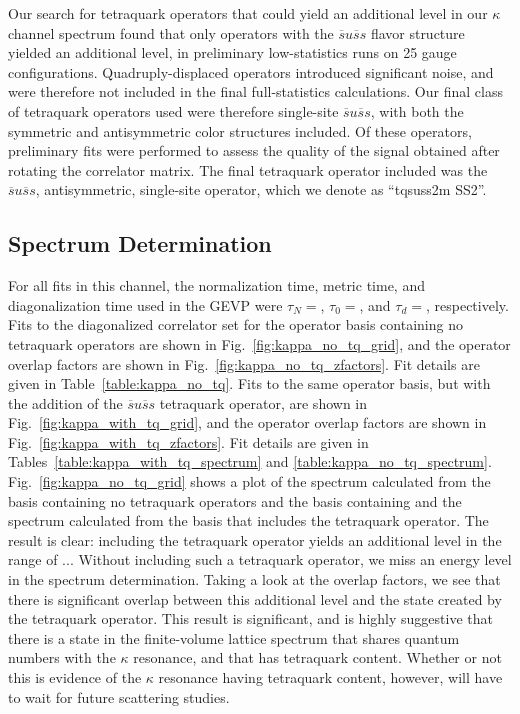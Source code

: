 Our search for tetraquark operators that could yield an additional level in our $\kappa$ channel spectrum found that only operators with the $\overline s u \overline s s$ flavor structure yielded an additional level, in preliminary low-statistics runs on 25 gauge configurations. Quadruply-displaced operators introduced significant noise, and were therefore not included in the final full-statistics calculations. Our final class of tetraquark operators used were therefore single-site $\overline s u \overline s s$, with both the symmetric and antisymmetric color structures included. Of these operators, preliminary fits were performed to assess the quality of the signal obtained after rotating the correlator matrix. The final tetraquark operator included was the $\overline s u \overline s s$, antisymmetric, single-site operator, which we denote as ``tqsuss2m SS2''.
\subsection{Spectrum Determination}
For all fits in this channel, the normalization time, metric time, and diagonalization time used in the GEVP were $\tau_N=$, $\tau_0=$, and $\tau_d=$, respectively. Fits to the diagonalized correlator set for the operator basis containing no tetraquark operators are shown in Fig.~\ref{fig:kappa_no_tq_grid}, and the operator overlap factors are shown in Fig.~\ref{fig:kappa_no_tq_zfactors}. Fit details are given in Table~\ref{table:kappa_no_tq}. Fits to the same operator basis, but with the addition of the $\overline s u \overline s s$ tetraquark operator, are shown in Fig.~\ref{fig:kappa_with_tq_grid}, and the operator overlap factors are shown in Fig.~\ref{fig:kappa_with_tq_zfactors}. Fit details are given in Tables~\ref{table:kappa_with_tq_spectrum} and \ref{table:kappa_no_tq_spectrum}. Fig.~\ref{fig:kappa_no_tq_grid} shows a plot of the spectrum calculated from the basis containing no tetraquark operators and the basis containing and the spectrum calculated from the basis that includes the tetraquark operator. The result is clear: including the tetraquark operator yields an additional level in the range of ... Without including such a tetraquark operator, we miss an energy level in the spectrum determination. Taking a look at the overlap factors, we see that there is significant overlap between this additional level and the state created by the tetraquark operator. This result is significant, and is highly suggestive that there is a state in the finite-volume lattice spectrum that shares quantum numbers with the $\kappa$ resonance, and that has tetraquark content. Whether or not this is evidence of the $\kappa$ resonance having tetraquark content, however, will have to wait for future scattering studies.

